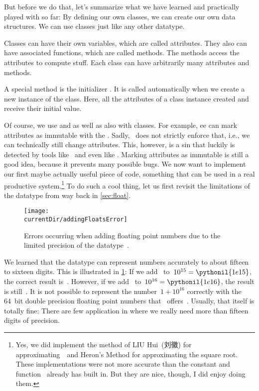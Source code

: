 But before we do that, let's summarize what we have learned and practically played with so far:
By defining our own classes, we can create our own data structures.
We can use classes just like any other datatype.

Classes can have their own variables, which are called attributes.
They also can have associated functions, which are called methods.
The methods access the attributes to compute stuff.
Each class can have arbitrarily many attributes and methods.

A special method is the initializer .
It is called automatically when we create a new instance of the class.
Here, all the attributes of a class instance created and receive their initial value.

Of course, we use  and  as well as  also with classes.
For example, ee can mark attributes as immutable with the  .
Sadly, \python\ does not strictly enforce that, i.e., we can technically still change  attributes.
This, however, is a sin that luckily is detected by tools like \mypy\ and even  like \pycharm.
Marking attributes as immutable is still a good idea, because it prevents many possible bugs.%
\FloatBarrier%
\endhsection%
%
%
\FloatBarrier%
%
We now want to implement our first maybe actually useful piece of code, something that can be used in a real productive system.\footnote{%
Yes, we did implement the method of LIU Hui~(刘徽) for approximating~\numberPi\ and Heron's Method for approximating the square root. %
These implementations were not more accurate than the constant and function \python\ already has built in. %
But they are nice, though, I did enjoy doing them.}
To do such a cool thing, let us first revisit the limitations of the datatype  from way back in \cref{sec:float}. %
%
\begin{figure}%
\centering%
\texttt{[image: \\currentDir/addingFloatsError]}%
\caption{Errors occurring when adding floating point numbers due to the limited precision of the datatype~.}%
\label{fig:addingFloatsError}%
\end{figure}%
%
We learned that the datatype  can represent numbers accurately to about fifteen to sixteen digits.
This is illustrated in \cref{fig:addingFloatsError}:
If we add~ to~$10^{15}=\pythonil{1e15}$, the correct result is~.
However, if we add~ to~$10^{16}=\pythonil{1e16}$, the result is still~.
It is not possible to represent the number~$1+10^{16}$ correctly with the 64~bit double precision floating point numbers that \python\ offers~\cite{PSF:P3D:TPT:FPAIAL}.
Usually, that itself is totally fine:
There are few application in  where we really need more than fifteen digits of precision.

